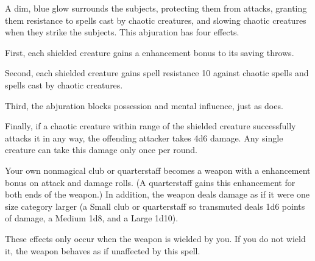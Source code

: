 \begin{spelleffect}
  A dim, blue glow surrounds the subjects, protecting them from attacks, granting them resistance to spells cast by chaotic creatures, and slowing chaotic creatures when they strike the subjects. This abjuration has four effects.
  \par First, each shielded creature gains a  enhancement bonus to its saving throws.
  \par Second, each shielded creature gains spell resistance 10 against chaotic spells and spells cast by chaotic creatures.
  \par Third, the abjuration blocks possession and mental influence, just as  does.
  \par Finally, if a chaotic creature within \rngmed range of the shielded creature successfully attacks it in any way, the offending attacker takes 4d6 damage. Any single creature can take this damage only once per round.
\end{spelleffect}

\spelldur{\durshort}
\begin{spelleffect}
  Your own nonmagical club or quarterstaff becomes a weapon with a  enhancement bonus on attack and damage rolls. \bonusscalingdescription (A quarterstaff gains this enhancement for both ends of the weapon.) In addition, the weapon deals damage as if it were one size category larger (a Small club or quarterstaff so transmuted deals 1d6 points of damage, a Medium 1d8, and a Large 1d10).
\end{spelleffect}
\begin{spellnotes}
  These effects only occur when the weapon is wielded by you. If you do not wield it, the weapon behaves as if unaffected by this spell.
\end{spellnotes}

